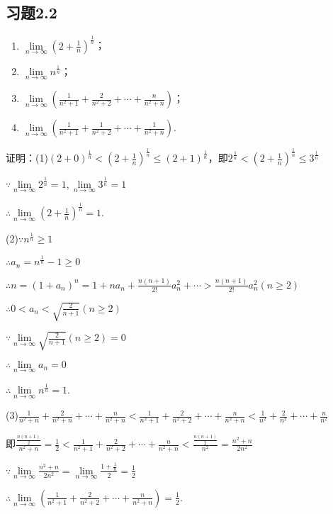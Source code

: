 \documentclass[12pt,UTF8]{ctexart}
\begin{document}
\subsection{习题2.2}
\begin{enumerate}
	\begin{enumerate}[(1)]
		\item$\lim\limits_{n\rightarrow\infty}(2+\frac1n)^{\frac1n}$；
		\item$\lim\limits_{n\rightarrow\infty}n^{\frac1n}$；
		\item$\lim\limits_{n\rightarrow\infty}(\frac1{n^2+1}+\frac2{n^2+2}+\cdots+\frac n{n^2+n})$；
		\item$\lim\limits_{n\rightarrow\infty}(\frac1{n^2+1}+\frac1{n^2+2}+\cdots+\frac 1{n^2+n})$.
	\end{enumerate}
证明：(1)$(2+0)^{\frac1n}<(2+\frac1n)^{\frac1n}\leq(2+1)^{\frac1n}$，即$2^{\frac1n}<(2+\frac1n)^{\frac1n}\leq3^{\frac1n}$

$\because\lim\limits_{n\rightarrow\infty}2^{\frac1n}=1,\lim\limits_{n\rightarrow\infty}3^{\frac1n}=1$

$\therefore\lim\limits_{n\rightarrow\infty}(2+\frac1n)^{\frac1n}=1$.

(2)$\because n^{\frac1n}\geq1$

$\therefore a_n=n^{\frac1n}-1\geq0$

$\therefore n=(1+a_n)^n=1+na_n+\frac{n(n+1)}{2!}a_n^2+\cdots>\frac{n(n+1)}{2!}a_n^2(n\geq2)$

$\therefore0<a_n<\sqrt{\frac2{n+1}}(n\geq2)$

$\because\lim\limits_{n\rightarrow\infty}\sqrt{\frac2{n+1}}(n\geq2)=0$

$\therefore\lim\limits_{n\rightarrow\infty}a_n=0$

$\therefore\lim\limits_{n\rightarrow\infty}n^{\frac1n}=1$.

(3)$\frac1{n^2+n}+\frac2{n^2+n}+\cdots+\frac n{n^2+n}<\frac1{n^2+1}+\frac2{n^2+2}+\cdots+\frac n{n^2+n}<\frac1{n^2}+\frac2{n^2}+\cdots+\frac n{n^2}$

即$\frac{\frac{n(n+1)}2}{n^2+n}=\frac12<\frac1{n^2+1}+\frac2{n^2+2}+\cdots+\frac n{n^2+n}<\frac{\frac{n(n+1)}2}{n^2}=\frac{n^2+n}{2n^2}$

$\because\lim\limits_{n\rightarrow\infty}\frac{n^2+n}{2n^2}=\lim\limits_{n\rightarrow\infty}\frac{1+\frac1n}{2}=\frac12$

$\therefore\lim\limits_{n\rightarrow\infty}(\frac1{n^2+1}+\frac2{n^2+2}+\cdots+\frac n{n^2+n})=\frac12$.


\end{enumerate}
\end{document}
